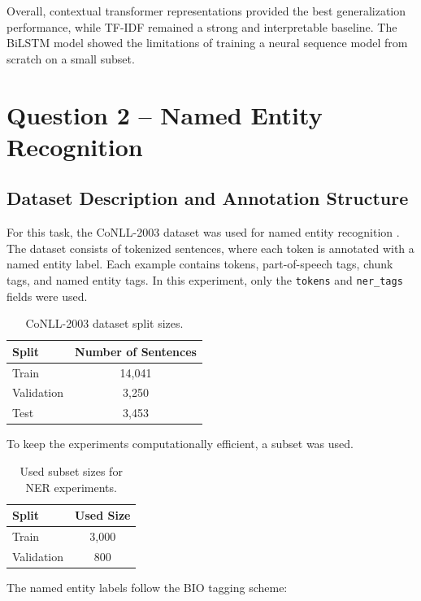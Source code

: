 \documentclass[11pt,a4paper]{article}
\begin{document}
Overall, contextual transformer representations provided the best generalization performance, while TF-IDF remained a strong and interpretable baseline. The BiLSTM model showed the limitations of training a neural sequence model from scratch on a small subset.

\section{Question 2 -- Named Entity Recognition}

\subsection{Dataset Description and Annotation Structure}

For this task, the CoNLL-2003 dataset was used for named entity recognition \cite{tjong2003conll}. The dataset consists of tokenized sentences, where each token is annotated with a named entity label. Each example contains tokens, part-of-speech tags, chunk tags, and named entity tags. In this experiment, only the \texttt{tokens} and \texttt{ner\_tags} fields were used.

\begin{table}[H]
\centering
\caption{CoNLL-2003 dataset split sizes.}
\begin{tabular}{lc}
\toprule
Split & Number of Sentences \\
\midrule
Train & 14,041 \\
Validation & 3,250 \\
Test & 3,453 \\
\bottomrule
\end{tabular}
\end{table}

To keep the experiments computationally efficient, a subset was used.

\begin{table}[H]
\centering
\caption{Used subset sizes for NER experiments.}
\begin{tabular}{lc}
\toprule
Split & Used Size \\
\midrule
Train & 3,000 \\
Validation & 800 \\
\bottomrule
\end{tabular}
\end{table}

The named entity labels follow the BIO tagging scheme:
\end{document}
